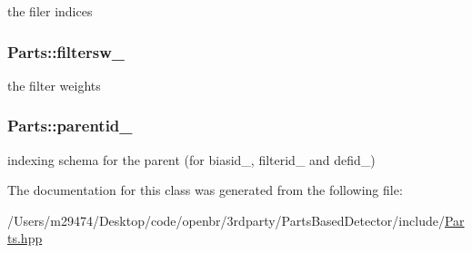 the filer indices 

\hypertarget{class_parts_a1de4d2cb595176d37aae609acbce88d8}{
\subsubsection[{filtersw\-\_\-}]{ Parts\-::filtersw\-\_\-\hspace{0.3cm}{\ttfamily [private]}}}\label{class_parts_a1de4d2cb595176d37aae609acbce88d8}


the filter weights 

\hypertarget{class_parts_ad74222c286ee6ee93659109a6d1d625f}{
\subsubsection[{parentid\-\_\-}]{ Parts\-::parentid\-\_\-\hspace{0.3cm}{\ttfamily [private]}}}\label{class_parts_ad74222c286ee6ee93659109a6d1d625f}


indexing schema for the parent (for biasid\-\_\-, filterid\-\_\- and defid\-\_\-) 



The documentation for this class was generated from the following file\-:\begin{DoxyCompactItemize}
\item 
/\-Users/m29474/\-Desktop/code/openbr/3rdparty/\-Parts\-Based\-Detector/include/\hyperlink{_parts_8hpp}{Parts.\-hpp}\end{DoxyCompactItemize}
